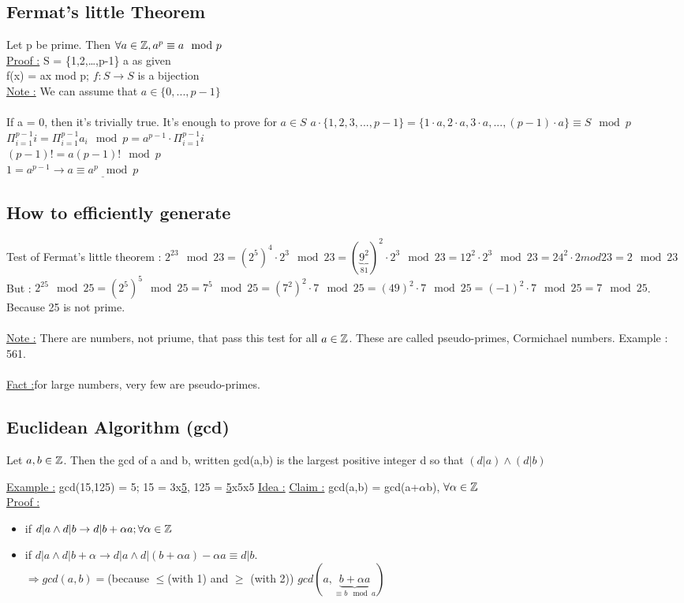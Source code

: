 \documentclass[12pt,a4paper]{article}
\begin{document}
\subsection{Fermat's little Theorem}
Let p be prime. Then $\forall a \in  \mathbb{Z}, a^p \equiv a \mod p$\\
\underline{Proof :} S = \{1,2,\ldots,p-1\} a as given\\
f(x) = ax mod p; $f: S \to S$ is a bijection\\
\underline{Note :} We can assume that $a \in \{0,...,p-1\}$\\
\\
If a = 0, then it's trivially true. It's enough to prove for $a \in S$
$a\cdot \{1,2,3,...,p-1\} = \{1\cdot a, 2\cdot a, 3\cdot a,...,(p-1)\cdot a\} \equiv S \mod p$\\
$\Pi^{p-1}_{i=1} i = \Pi^{p-1}_{i=1}a_i \mod p = a^{p-1}\cdot \Pi^{p-1}_{i=1}i$\\
$(p-1)! = a(p-1)! \mod p$\\
$1 = a^{p-1} \to \underline{a \equiv a^p \mod p}$
\subsection{How to efficiently generate}
Test of Fermat's little theorem :
$2^23 \mod 23 = (2^5)^4\cdot 2^3 \mod 23 = (\underbrace{9^2}_{81})^2 \cdot 2^3 \mod 23 =12^2\cdot2^3 \mod 23 = 24^2\cdot 2 mod 23 = 2 \mod 23$\\

But : $2^{25} \mod 25 = (2^5)^5 \mod 25 = 7^5 \mod 25 = (7^2)^2\cdot 7 \mod 25 = (49)^2 \cdot 7 \mod 25 = (-1)^2 \cdot 7 \mod 25 = 7 \mod 25$. Because 25 is not prime.\\
\\
\underline{Note :} There are numbers, not priume, that pass this test for all $a \in \mathbb{Z}$. These are called pseudo-primes, Cormichael numbers. Example : 561.\\
\\
\underline{Fact :}for large numbers, very few are pseudo-primes.
\subsection{Euclidean Algorithm (gcd)}
\begin{boite}
Let $a,b \in \mathbb{Z}$. Then the gcd of a and b, written gcd(a,b) is the largest positive integer d so that $(d|a)\wedge(d|b)$
\end{boite}
\underline{Example :} gcd(15,125) = 5; 15 = 3x\underline{5}, 125 = \underline{5}x5x5
\underline{Idea :} \underline{Claim :} gcd(a,b) = gcd(a+$\alpha$b), $\forall \alpha \in \mathbb{Z}$\\
\underline{Proof :} \begin{itemize}
\item if $d|a \wedge d|b \to d|b+\alpha a; \forall \alpha \in \mathbb{Z}$
\item if $d|a \wedge d|b+\alpha \to d|a \wedge d|(b+\alpha a) - \alpha a \equiv d|b$. \\
	$\Rightarrow gcd(a,b) = $(because $\leq$(with 1) and $\geq$ (with 2)) $gcd(a, \underbrace{b+\alpha a}_{\equiv b \mod a})$ 
\end{itemize}
\end{document}
